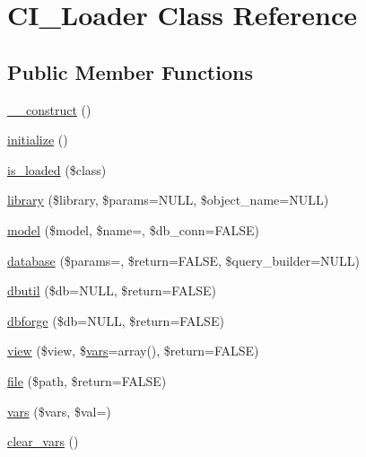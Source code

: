 \hypertarget{class_c_i___loader}{}\section{C\+I\+\_\+\+Loader Class Reference}
\label{class_c_i___loader}
\subsection*{Public Member Functions}
\begin{DoxyCompactItemize}
\item 
\mbox{\hyperlink{class_c_i___loader_a095c5d389db211932136b53f25f39685}{\+\_\+\+\_\+construct}} ()
\item 
\mbox{\hyperlink{class_c_i___loader_a91098fa7d1917ce4833f284bbef12627}{initialize}} ()
\item 
\mbox{\hyperlink{class_c_i___loader_a57ba1b43ec1d58c07a2d1e8cd00b9658}{is\+\_\+loaded}} (\$class)
\item 
\mbox{\hyperlink{class_c_i___loader_a03207e0bcf58b6c9ecbc09fd2d8eab5d}{library}} (\$library, \$params=N\+U\+LL, \$object\+\_\+name=N\+U\+LL)
\item 
\mbox{\hyperlink{class_c_i___loader_ace7dfcb22d8a5220abf43886baa25b10}{model}} (\$model, \$name=\textquotesingle{}\textquotesingle{}, \$db\+\_\+conn=F\+A\+L\+SE)
\item 
\mbox{\hyperlink{class_c_i___loader_a33e2aa18a2f1943b15b0efe5abcc80e9}{database}} (\$params=\textquotesingle{}\textquotesingle{}, \$return=F\+A\+L\+SE, \$query\+\_\+builder=N\+U\+LL)
\item 
\mbox{\hyperlink{class_c_i___loader_a9b841fe10e3083b4c3266359a42cf8f8}{dbutil}} (\$db=N\+U\+LL, \$return=F\+A\+L\+SE)
\item 
\mbox{\hyperlink{class_c_i___loader_acce260e75c2c0525d626241970dbcf8c}{dbforge}} (\$db=N\+U\+LL, \$return=F\+A\+L\+SE)
\item 
\mbox{\hyperlink{class_c_i___loader_a338c66f36b2406ff1e14e7d64515b40c}{view}} (\$view, \$\mbox{\hyperlink{class_c_i___loader_a6fb4bfc8364ff6b8e4dc137faa36232a}{vars}}=array(), \$return=F\+A\+L\+SE)
\item 
\mbox{\hyperlink{class_c_i___loader_a47e4b8eda2bbf9e8bb505cdafb8e4ba5}{file}} (\$path, \$return=F\+A\+L\+SE)
\item 
\mbox{\hyperlink{class_c_i___loader_a6fb4bfc8364ff6b8e4dc137faa36232a}{vars}} (\$vars, \$val=\textquotesingle{}\textquotesingle{})
\item 
\mbox{\hyperlink{class_c_i___loader_a62226f7423f098251274c81586b7a8bf}{clear\+\_\+vars}} ()

\end{DoxyCompactItemize}

